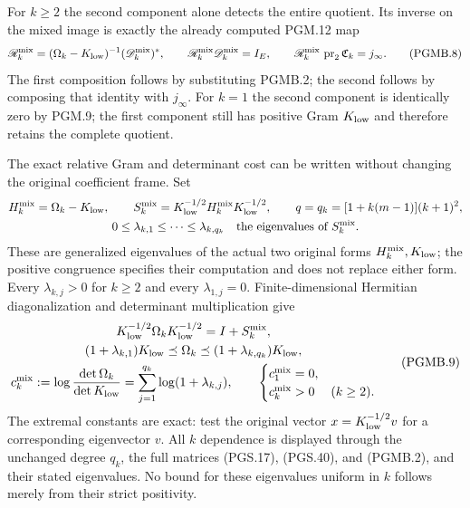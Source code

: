 \documentclass[11pt,a4paper]{article}
\theoremstyle{definition}
\begin{document}
For $k\geq2$ the second component alone detects the entire
quotient. Its inverse on the mixed image is exactly the
already computed PGM.12 map
\[
 \mathscr R_k^{\rm mix}
 = (\Omega_k-K_{\rm low})^{-1}(\mathscr D_k^{\rm mix})^*,
 \qquad
 \mathscr R_k^{\rm mix}\mathscr D_k^{\rm mix}=I_E,
 \qquad
 \mathscr R_k^{\rm mix}\,\operatorname{pr}_2\mathfrak C_k
                                  =j_\infty.
 \tag{PGMB.8}\label{eq:pgmb-mixed-inverse-composite}
\]
The first composition follows by substituting PGMB.2; the
second follows by composing that identity with $j_\infty$.
For $k=1$ the second component is identically zero by PGM.9;
the first component still has positive Gram $K_{\rm low}$
and therefore retains the complete quotient.

The exact relative Gram and determinant cost can be written
without changing the original coefficient frame. Set
\[
 \begin{gathered}
 H_k^{\rm mix}=\Omega_k-K_{\rm low},\qquad
 S_k^{\rm mix}=K_{\rm low}^{-1/2}H_k^{\rm mix}K_{\rm low}^{-1/2},\qquad
 q=q_k=[1+k(m-1)](k+1)^2,\\
 0\leq\lambda_{k,1}\leq\cdots\leq\lambda_{k,q_k}
       \quad\hbox{the eigenvalues of }S_k^{\rm mix}.
 \end{gathered}
\]
These are generalized eigenvalues of the actual two original
forms $H_k^{\rm mix},K_{\rm low}$; the positive congruence
specifies their computation and does not replace either form.
Every $\lambda_{k,j}>0$ for $k\geq2$ and every
$\lambda_{1,j}=0$. Finite-dimensional Hermitian diagonalization
and determinant multiplication give
\[
 \begin{gathered}
 K_{\rm low}^{-1/2}\Omega_kK_{\rm low}^{-1/2}
                                     =I+S_k^{\rm mix},\\
 (1+\lambda_{k,1})K_{\rm low}\preceq\Omega_k
             \preceq(1+\lambda_{k,q_k})K_{\rm low},\\
 c_k^{\rm mix}:=\log\frac{\det\Omega_k}{\det K_{\rm low}}
       =\sum_{j=1}^{q_k}\log(1+\lambda_{k,j}),\qquad
 \begin{cases}c_1^{\rm mix}=0,\\c_k^{\rm mix}>0& (k\geq2).
 \end{cases}
 \end{gathered}
 \tag{PGMB.9}\label{eq:pgmb-relative-cost}
\]
The extremal constants are exact: test the original vector
$x=K_{\rm low}^{-1/2}v$ for a corresponding eigenvector $v$.
All $k$ dependence is displayed through the unchanged degree
$q_k$, the full matrices (PGS.17), (PGS.40), and (PGMB.2),
and their stated eigenvalues. No bound for these eigenvalues
uniform in $k$ follows merely from their strict positivity.
\end{document}
